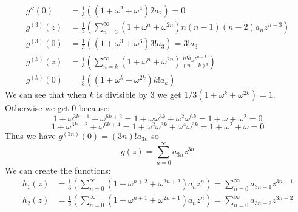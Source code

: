 \documentclass{article}
\begin{document}
\begin{enumerate}
\begin{align*}
        g''(0)&=\frac{1}{3}\left((1+\omega^2+\omega^{4})2a_2\right)=0\\
        g^{(3)}(z)&=\frac{1}{3}\left(\sum_{n=3}^\infty(1+\omega^n+\omega^{2n})n(n-1)(n-2)a_nz^{n-3}\right)\\
        g^{(3)}(0)&=\frac{1}{3}\left((1+\omega^3+\omega^{6})3!a_3\right)=3!a_3\\
        g^{(k)}(z)&=\frac{1}{3}\left(\sum_{n=k}^\infty(1+\omega^n+\omega^{2n})\frac{n!a_nz^{n-k}}{(n-k)!}\right)\\
        g^{(k)}(0)&=\frac{1}{3}\left((1+\omega^k+\omega^{2k})k!a_k\right)
      \end{align*}
      We can see that when $k$ is divisible by 3 we get $1/3(1+\omega^k+\omega^{2k})=1$. Otherwise
      we get 0 because:
      \[1+\omega^{3k+1}+\omega^{6k+2}=1+\omega\omega^{3k}+\omega^2\omega^{6k}=1+\omega+\omega^2=0\]
      \[1+\omega^{3k+2}+\omega^{6k+4}=1+\omega^2\omega^{3k}+\omega^4\omega^{6k}=1+\omega^2+\omega=0\]
      Thus we have $g^{(3n)}(0)=(3n)!a_{3n}$ so
      \[g(z)=\sum_{n=0}^\infty a_{3n}z^{3n}\]
      We can create the functions:
      \begin{align*}
        h_1(z)&=\frac{1}{3}\left(\sum_{n=0}^\infty(1+\omega^{n+2}+\omega^{2n+2})a_nz^n\right)=\sum_{n=0}^\infty a_{3n+1}z^{3n+1}\\
        h_2(z)&=\frac{1}{3}\left(\sum_{n=0}^\infty(1+\omega^{n+1}+\omega^{2n+1})a_nz^n\right)=\sum_{n=0}^\infty a_{3n+2}z^{3n+2}
      \end{align*}
  \end{enumerate}
\end{document}
